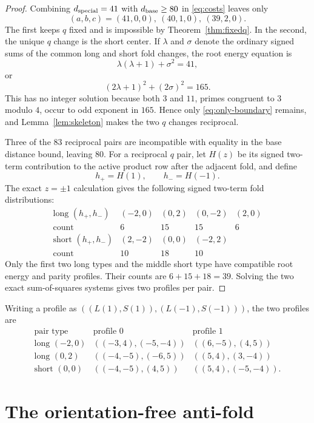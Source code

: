 \documentclass[11pt]{article}
\theoremstyle{remark}
\begin{document}
\begin{proof}
Combining $d_{\rm special}=41$ with $d_{\rm base}\geq80$ in
\eqref{eq:costs} leaves only
\[
 (a,b,c)=(41,0,0),\ (40,1,0),\ (39,2,0).
\]
The first keeps $q$ fixed and is impossible by
Theorem~\ref{thm:fixedq}.  In the second, the unique $q$ change is the
short center.  If $\lambda$ and $\sigma$ denote the ordinary signed sums
of the common long and short fold changes, the root energy equation is
\[
 \lambda(\lambda+1)+\sigma^2=41,
\]
or
\[
 (2\lambda+1)^2+(2\sigma)^2=165.
\]
This has no integer solution because both $3$ and $11$, primes congruent
to $3$ modulo $4$, occur to odd exponent in $165$.  Hence only
\eqref{eq:only-boundary} remains, and Lemma~\ref{lem:skeleton} makes the
two $q$ changes reciprocal.

Three of the $83$ reciprocal pairs are incompatible with equality in the
base distance bound, leaving $80$.  For a reciprocal $q$ pair, let
$H(z)$ be its signed two-term contribution to the active product row after
the adjacent fold, and define
\[
 h_+=H(1),\qquad h_-=H(-1).
\]
The exact $z=\pm1$ calculation gives
the following signed two-term fold distributions:
\[
\begin{array}{c|rrrr}
\text{long }(h_+,h_-)&(-2,0)&(0,2)&(0,-2)&(2,0)\\
\text{count}&6&15&15&6\\ \hline
\text{short }(h_+,h_-)&(2,-2)&(0,0)&(-2,2)&\\
\text{count}&10&18&10&
\end{array}
\]
Only the first two long types and the middle short type have compatible
root energy and parity profiles.  Their counts are $6+15+18=39$.
Solving the two exact sum-of-squares systems gives two profiles per pair.
\end{proof}

Writing a profile as
$((L(1),S(1)),(L(-1),S(-1)))$, the two profiles are
\begin{equation}
\label{eq:root-profiles}
\begin{array}{c|cc}
\text{pair type}&\text{profile 0}&\text{profile 1}\\ \hline
\text{long }(-2,0)&((-3,4),(-5,-4))&((6,-5),(4,5))\\
\text{long }(0,2)&((-4,-5),(-6,5))&((5,4),(3,-4))\\
\text{short }(0,0)&((-4,-5),(4,5))&((5,4),(-5,-4)).
\end{array}
\end{equation}

\section{The orientation-free anti-fold}
\label{sec:antifold}
\end{document}
